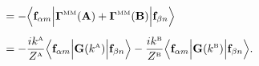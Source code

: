\begin{enumerate}
\begin{align*}
 &= -\Big\langle \mathbf{f}_{\alpha m} 
    \Big| \boldsymbol{\Gamma}^{\hbox{\tiny{MM}}}(\mathbf{A}) + \boldsymbol{\Gamma}^{\hbox{\tiny{MM}}}(\mathbf{B}) \Big|
                \mathbf{f}_{\beta n} 
    \Big\rangle
\\[5pt]
 &= -\frac{ik^{\hbox{\tiny{A}}}}{Z^{\hbox{\tiny{A}}}}
    \Big\langle \mathbf{f}_{\alpha m} 
                 \Big| \mathbf{G}(k^{\hbox{\tiny{A}}}) \Big|
                 \mathbf{f}_{\beta n} 
    \Big\rangle
    -
    \frac{ik^{\hbox{\tiny{B}}}}{Z^{\hbox{\tiny{B}}}}
    \Big\langle \mathbf{f}_{\alpha m} 
                 \Big| \mathbf{G}(k^{\hbox{\tiny{B}}}) \Big|
                 \mathbf{f}_{\beta n}
    \Big\rangle.
\\[10pt]
\end{align*}
\end{enumerate}

